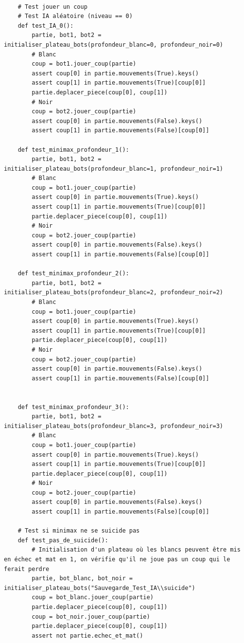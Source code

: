 \documentclass{article}
\begin{document}
\begin{verbatim}

    # Test jouer un coup
    # Test IA aléatoire (niveau == 0)
    def test_IA_0():
        partie, bot1, bot2 = initialiser_plateau_bots(profondeur_blanc=0, profondeur_noir=0)
        # Blanc
        coup = bot1.jouer_coup(partie)
        assert coup[0] in partie.mouvements(True).keys()
        assert coup[1] in partie.mouvements(True)[coup[0]]
        partie.deplacer_piece(coup[0], coup[1])
        # Noir
        coup = bot2.jouer_coup(partie)
        assert coup[0] in partie.mouvements(False).keys()
        assert coup[1] in partie.mouvements(False)[coup[0]]
    
    def test_minimax_profondeur_1():
        partie, bot1, bot2 = initialiser_plateau_bots(profondeur_blanc=1, profondeur_noir=1)
        # Blanc
        coup = bot1.jouer_coup(partie)
        assert coup[0] in partie.mouvements(True).keys()
        assert coup[1] in partie.mouvements(True)[coup[0]]
        partie.deplacer_piece(coup[0], coup[1])
        # Noir
        coup = bot2.jouer_coup(partie)
        assert coup[0] in partie.mouvements(False).keys()
        assert coup[1] in partie.mouvements(False)[coup[0]]
    
    def test_minimax_profondeur_2():
        partie, bot1, bot2 = initialiser_plateau_bots(profondeur_blanc=2, profondeur_noir=2)
        # Blanc
        coup = bot1.jouer_coup(partie)
        assert coup[0] in partie.mouvements(True).keys()
        assert coup[1] in partie.mouvements(True)[coup[0]]
        partie.deplacer_piece(coup[0], coup[1])
        # Noir
        coup = bot2.jouer_coup(partie)
        assert coup[0] in partie.mouvements(False).keys()
        assert coup[1] in partie.mouvements(False)[coup[0]]
        
        
    def test_minimax_profondeur_3():
        partie, bot1, bot2 = initialiser_plateau_bots(profondeur_blanc=3, profondeur_noir=3)
        # Blanc
        coup = bot1.jouer_coup(partie)
        assert coup[0] in partie.mouvements(True).keys()
        assert coup[1] in partie.mouvements(True)[coup[0]]
        partie.deplacer_piece(coup[0], coup[1])
        # Noir
        coup = bot2.jouer_coup(partie)
        assert coup[0] in partie.mouvements(False).keys()
        assert coup[1] in partie.mouvements(False)[coup[0]]
        
    # Test si minimax ne se suicide pas 
    def test_pas_de_suicide():
        # Initialisation d'un plateau où les blancs peuvent être mis en échec et mat en 1, on vérifie qu'il ne joue pas un coup qui le ferait perdre
        partie, bot_blanc, bot_noir = initialiser_plateau_bots("Sauvegarde_Test_IA\\suicide")
        coup = bot_blanc.jouer_coup(partie)
        partie.deplacer_piece(coup[0], coup[1])
        coup = bot_noir.jouer_coup(partie)
        partie.deplacer_piece(coup[0], coup[1])
        assert not partie.echec_et_mat()    
\end{verbatim}
\end{document}
